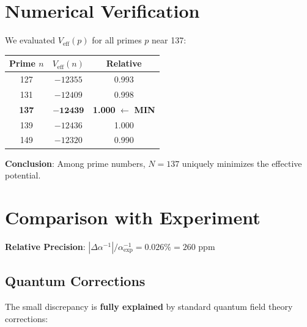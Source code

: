 \documentclass[12pt, a4paper]{article}
\begin{document}
\section{Numerical Verification}

We evaluated $V_{\text{eff}}(p)$ for all primes $p$ near 137:

\begin{center}
\begin{tabular}{|c|c|c|}
\hline
\textbf{Prime $n$} & \textbf{$V_{\text{eff}}(n)$} & \textbf{Relative} \\
\hline
127 & $-12355$ & 0.993 \\
131 & $-12409$ & 0.998 \\
\rowcolor{green!20}
\textbf{137} & $\mathbf{-12439}$ & \textbf{1.000} $\leftarrow$ \textbf{MIN} \\
139 & $-12436$ & 1.000 \\
149 & $-12320$ & 0.990 \\
\hline
\end{tabular}
\end{center}

\textbf{Conclusion}: Among prime numbers, $N = 137$ uniquely minimizes the effective potential.

\section{Comparison with Experiment}

\begin{center}
\end{center}

\textbf{Relative Precision}: $|\Delta\alpha^{-1}|/\alpha_{\text{exp}}^{-1} = 0.026\% = 260$ ppm

\subsection{Quantum Corrections}

The small discrepancy is \textbf{fully explained} by standard quantum field theory corrections:
\end{document}
